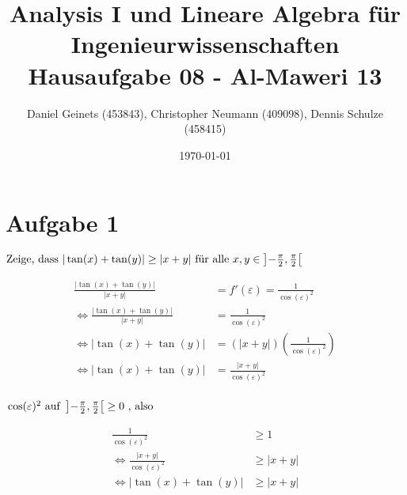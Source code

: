 \documentclass[a4paper, 11pt]{article}
\author{Daniel Geinets (453843), Christopher Neumann (409098), Dennis Schulze (458415)}
\date{\today}
\title{Analysis I und Lineare Algebra für Ingenieurwissenschaften \large  \\ Hausaufgabe 08 - Al-Maweri 13}
\begin{document}
\maketitle
\tableofcontents

\setcounter{secnumdepth}{0}
\newcommand{\tuple}[1]{\left(#1\right)}
\newcommand{\R}{\mathbb{R}}
\newcommand{\Z}{\mathbb{Z}}
\newcommand{\Q}{\mathbb{Q}}
\newcommand{\N}{\mathbb{N}}
\newcommand{\C}{\mathbb{C}}

\makeatletter
\renewcommand*\env@matrix[1][*\c@MaxMatrixCols c]{%
\hskip -\arraycolsep
\let\@ifnextchar\new@ifnextchar
\array{#1}}
\makeatother

\pagebreak

\section{Aufgabe 1}
\label{sec:orgd25fb7f}
\begin{math}
    \text{Zeige, dass  }|\tan(x)+\tan(y)| \geq |x+y|
        \text{  für alle  }x,y \in \left]-\frac{\pi}{2}, \frac{\pi}{2} \right[
    \newline
    \newline
\end{math}

\begin{align*}
    \frac{|\tan(x)+\tan(y)|}{|x+y|} &= f'(\varepsilon) = \frac{1}{\cos(\varepsilon)^2} \\
    \Leftrightarrow   \frac{|\tan(x)+\tan(y)|}{|x+y|} &=  \frac{1}{\cos(\varepsilon)^2} \\
    \Leftrightarrow |\tan(x)+\tan(y)| &= (|x+y|)\left(\frac{1}{\cos(\varepsilon)^2}\right)\\
    \Leftrightarrow |\tan(x)+\tan(y)| &= \frac{|x+y|}{\cos(\varepsilon)^2}\\
\end{align*}

\begin{math}
    \newline
    \cos(\varepsilon)^2 \text{  auf  } \left]-\frac{\pi}{2}, \frac{\pi}{2} \right[
        \geq 0 \text{  , also}
    \newline
\end{math}

\begin{align*}
    \frac{1}{\cos(\varepsilon)^2} &\geq 1 \\
    \Leftrightarrow \frac{|x+y|}{\cos(\varepsilon)^2} &\geq |x+y| \\
    \Leftrightarrow |\tan(x)+\tan(y)| &\geq |x+y|
\end{align*}
\end{document}
